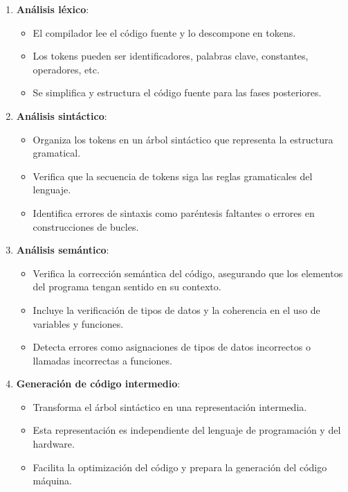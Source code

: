 \begin{enumerate}
    \item \textbf{Análisis léxico}: 
        \begin{itemize}
            \item El compilador lee el código fuente y lo descompone en tokens.
            \item Los tokens pueden ser identificadores, palabras clave, constantes, operadores, etc.
            \item Se simplifica y estructura el código fuente para las fases posteriores.
        \end{itemize}

    \item \textbf{Análisis sintáctico}:
        \begin{itemize}
            \item Organiza los tokens en un árbol sintáctico que representa la estructura gramatical.
            \item Verifica que la secuencia de tokens siga las reglas gramaticales del lenguaje.
            \item Identifica errores de sintaxis como paréntesis faltantes o errores en construcciones de bucles.
        \end{itemize}

    \item \textbf{Análisis semántico}:
        \begin{itemize}
            \item Verifica la corrección semántica del código, asegurando que los elementos del programa tengan sentido en su contexto.
            \item Incluye la verificación de tipos de datos y la coherencia en el uso de variables y funciones.
            \item Detecta errores como asignaciones de tipos de datos incorrectos o llamadas incorrectas a funciones.
        \end{itemize}

    \item \textbf{Generación de código intermedio}:
        \begin{itemize}
            \item Transforma el árbol sintáctico en una representación intermedia.
            \item Esta representación es independiente del lenguaje de programación y del hardware.
            \item Facilita la optimización del código y prepara la generación del código máquina.
        \end{itemize}


\end{enumerate}
